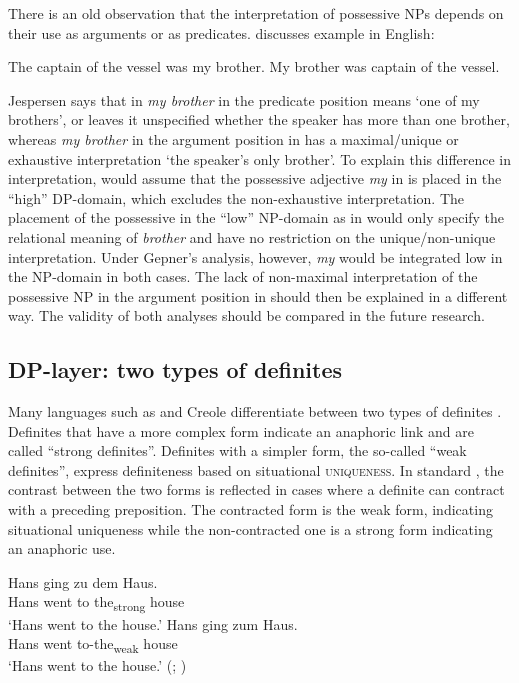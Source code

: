 \documentclass[output=paper]{langscibook}
\begin{document}
There is an old observation that the interpretation of possessive NPs depends on their use as arguments or as predicates. \citet{Jespersen1965} discusses example  in English:

\ea \label{ex:6} \ea The captain of the vessel was my brother. \label{ex:6a}
\ex My brother was captain of the vessel.\label{ex:6b}
\z \z

\noindent Jespersen says that in  \textit{my brother} in the predicate position means `one of my brothers', or leaves it unspecified whether the speaker has more than one brother, whereas \textit{my brother} in the argument position in  has a maximal/unique or exhaustive interpretation `the speaker’s only brother'. To explain this difference in interpretation, \citet{Kagan.Pereltsvaig2014} would assume that the possessive adjective \textit{my} in  is placed in the ``high'' DP-domain, which excludes the non-ex\-haustive interpretation. The placement of the possessive in the ``low'' NP-domain as in  would only specify the relational meaning of \textit{brother} and have no restriction on the unique/non-unique interpretation. Under Gepner's analysis, however, \textit{my} would be integrated low in the NP-domain in both cases. The lack of non-maximal interpretation of the possessive NP in the argument position in  should then be explained in a different way. The validity of both analyses should be compared in the future research.

\subsection{DP-layer: two types of definites}

Many languages such as  and  Creole differentiate between two types of definites \citep{Lobner2011,Schwarz2009,Schwarz2013,Jenks2015}. Definites that have a more complex form indicate an anaphoric link and are called ``strong definites''. Definites with a simpler form, the so-called ``weak definites'', express definiteness based on situational \textsc{uniqueness}. In standard , the contrast between the two forms is reflected in cases where a definite can contract with a preceding preposition. The contracted form is the weak form, indicating situational uniqueness while the non-contracted one is a strong form indicating an anaphoric use.


\ea \label{ex:7}
\ea
\gll Hans ging zu dem Haus. \\
    Hans went to the\textsubscript{strong} house\\ %
\glt `Hans went to the house.' \label{ex:7a}
\ex \gll Hans ging zum Haus. \\
 Hans went to-the\textsubscript{weak} house\\ %
\glt `Hans went to the house.' \hfill (; \citealt[12]{Schwarz2009}) \label{ex:7b}
\z \z
\end{document}
